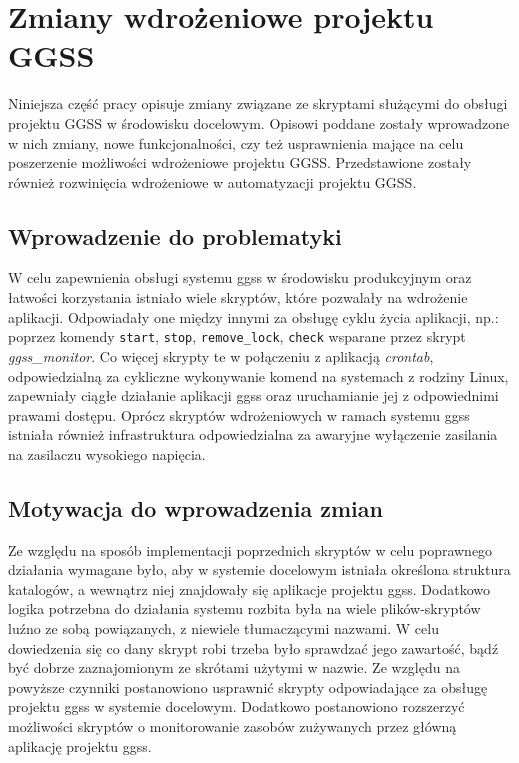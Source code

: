 \clearpage
\section{Zmiany wdrożeniowe projektu GGSS}
\label{ch:scripts}


Niniejsza część pracy opisuje zmiany związane ze skryptami służącymi do obsługi projektu GGSS w środowisku docelowym. Opisowi poddane zostały wprowadzone w nich zmiany, nowe funkcjonalności, czy też usprawnienia mające na celu poszerzenie możliwości wdrożeniowe projektu GGSS. Przedstawione zostały również rozwinięcia wdrożeniowe w automatyzacji projektu GGSS.

\subsection{Wprowadzenie do problematyki}

W celu zapewnienia obsługi systemu ggss w środowisku produkcyjnym oraz łatwości korzystania istniało wiele skryptów, które pozwalały na wdrożenie aplikacji. Odpowiadały one między innymi za obsługę cyklu życia aplikacji, np.: poprzez komendy \lstinline{start}, \lstinline{stop}, \lstinline{remove_lock}, \lstinline{check} wsparane przez skrypt \emph{ggss\_monitor}. Co więcej skrypty te w połączeniu z aplikacją \emph{crontab}, odpowiedzialną za cykliczne wykonywanie komend na systemach z rodziny Linux, zapewniały ciągłe działanie aplikacji ggss oraz uruchamianie jej z odpowiednimi prawami dostępu. Oprócz skryptów wdrożeniowych w ramach systemu ggss istniała również infrastruktura odpowiedzialna za awaryjne wyłączenie zasilania na zasilaczu wysokiego napięcia.

\subsection{Motywacja do wprowadzenia zmian}
\label{sec:scripts_motiv}

Ze względu na sposób implementacji poprzednich skryptów w celu poprawnego działania wymagane było, aby w systemie docelowym istniała określona struktura katalogów, a wewnątrz niej znajdowały się aplikacje projektu ggss. Dodatkowo logika potrzebna do działania systemu rozbita była na wiele plików-skryptów luźno ze sobą powiązanych, z niewiele tłumaczącymi nazwami. W celu dowiedzenia się co dany skrypt robi trzeba było sprawdzać jego zawartość, bądź być dobrze zaznajomionym ze skrótami użytymi w nazwie. Ze względu na powyższe czynniki postanowiono usprawnić skrypty odpowiadające za obsługę projektu ggss w systemie docelowym. Dodatkowo postanowiono rozszerzyć możliwości skryptów o monitorowanie zasobów zużywanych przez główną aplikację projektu ggss.

